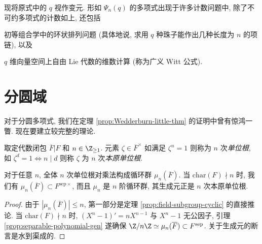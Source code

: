 现将原式中的 $q$ 视作变元. 形如 $\Psi_n(q)$ 的多项式出现于许多计数问题中, 除了不可约多项式的计数如上, 还包括
\begin{inparaenum}[(a)]
	\item 初等组合学中的环状排列问题 (具体地说, 求用 $q$ 种珠子能作出几种长度为 $n$ 的项链), 以及
	\item $q$ 维向量空间上自由 Lie 代数的维数计算 (称为广义 Witt 公式).
\end{inparaenum}

\section{分圆域}\label{sec:cyclotomic-ext}
对于分圆多项式, 我们在定理 \ref{prop:Wedderburn-little-thm} 的证明中曾有惊鸿一瞥. 现在要建立较完整的理论.

\begin{definition}
	取定代数闭包 $\overline{F}|F$ 和 $n \in \Z_{\geq 1}$. 元素 $\zeta \in \overline{F}^\times$ 如满足 $\zeta^n = 1$ 则称为 $n$ 次\emph{单位根}, 如 $\zeta^d = 1 \iff n \mid d$ 则称 $\zeta$ 为 $n$ 次\emph{本原单位根}.
\end{definition}

\begin{proposition}
	对于任意 $n$, 全体 $n$ 次单位根对乘法构成循环群 $\mu_n(\overline{F})$. 当 $\mathrm{char}(F) \nmid n$ 时, 我们有 $\mu_n(\overline{F}) \subset F^{\mathrm{sep}\times}$, 而且 $\mu_n$ 是 $n$ 阶循环群, 其生成元正是 $n$ 次本原单位根.
\end{proposition}
\begin{proof}
	由于 $|\mu_n(\overline{F})| \leq n$, 第一部分是定理 \ref{prop:field-subgroup-cyclic} 的直接推论. 当 $\text{char}(F) \nmid n$ 时, $(X^n-1)' = nX^{n-1}$ 与 $X^n-1$ 无公因子, 引理 \ref{prop:separable-polynomial-gen} 遂确保 $\Z/n\Z \simeq \mu_n(\overline{F}) \subset F^\text{sep}$. 关于生成元的断言是水到渠成的.
\end{proof}

